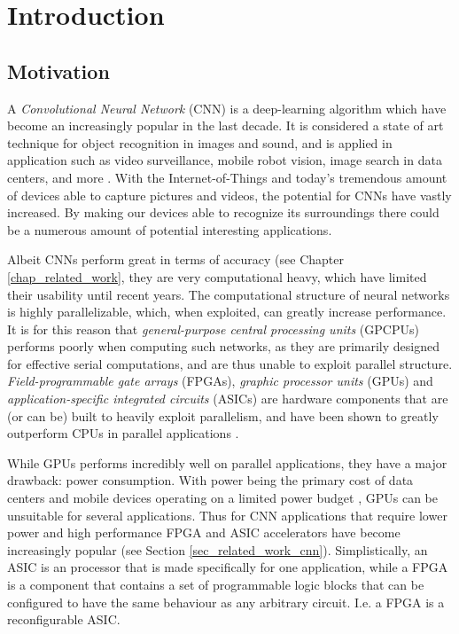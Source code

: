 \chapter{Introduction}

\section{Motivation}

A \textit{Convolutional Neural Network} (CNN) is a deep-learning algorithm which have become an increasingly popular in the last decade. It is considered a state of art technique for object recognition in images and sound, and is applied in application such as video surveillance, mobile robot vision, image search in data centers, and more \cite{Chineste_I_think} \cite{Farabet2009} \cite{Action_Capture} \cite{Ovtcharov2015}. With the Internet-of-Things and today's tremendous amount of devices able to capture pictures and videos, the potential for CNNs have vastly increased. By making our devices able to recognize its surroundings there could be a numerous amount of potential interesting applications.

Albeit CNNs perform great in terms of accuracy (see Chapter \ref{chap_related_work}, they are very computational heavy, which have limited their usability until recent years. The computational structure of neural networks is highly parallelizable, which, when exploited, can greatly increase performance. It is for this reason that \textit{general-purpose central processing units} (GPCPUs) performs poorly when computing such networks, as they are primarily designed for effective serial computations, and are thus unable to exploit parallel structure. \textit{Field-programmable gate arrays} (FPGAs), \textit{graphic processor units} (GPUs) and \textit{application-specific integrated circuits} (ASICs) are hardware components that are (or can be) built to heavily exploit parallelism, and have been shown to greatly outperform CPUs in parallel applications \cite{FPGA_VS_CPU_GPU}.

While GPUs performs incredibly well on parallel applications, they have a major drawback: power consumption. With power being the primary cost of data centers and mobile devices operating on a limited power budget \cite{EU_Thingy}, GPUs can be unsuitable for several applications. Thus for CNN applications that require lower power and high performance FPGA and ASIC accelerators have become increasingly popular (see Section \ref{sec_related_work_cnn}). Simplistically, an ASIC is an processor that is made specifically for one application,  while a FPGA is a component that contains a set of programmable logic blocks that can be configured to have the same behaviour as any arbitrary circuit. I.e. a FPGA is a reconfigurable ASIC. 


